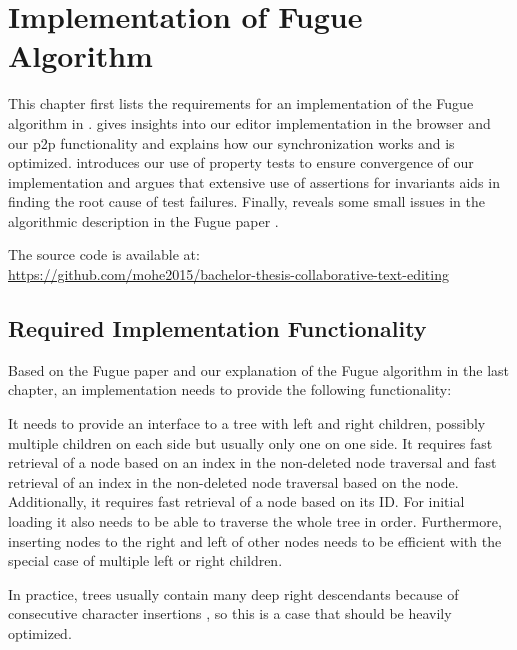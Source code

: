 \chapter{Implementation of Fugue Algorithm} \label{section:implementation}

This chapter first lists the requirements for an implementation of the Fugue algorithm in .  gives insights into our editor implementation in the browser and our \gls{p2p} functionality and  explains how our synchronization works and is optimized.  introduces our use of property tests to ensure convergence of our implementation and argues that extensive use of assertions for invariants aids in finding the root cause of test failures. Finally,  reveals some small issues in the algorithmic description in the Fugue paper \cite{2023-weidner-minimizing-interleaving}.

The source code is available at:\\
\url{https://github.com/mohe2015/bachelor-thesis-collaborative-text-editing}

\section{Required Implementation Functionality} \label{section:implementation-requirements}

Based on the Fugue paper \cite{2023-weidner-minimizing-interleaving} and our explanation of the Fugue algorithm in the last chapter, an implementation needs to provide the following functionality:

It needs to provide an interface to a tree with left and right children, possibly multiple children on each side but usually only one on one side. It requires fast retrieval of a node based on an index in the non-deleted node traversal and fast retrieval of an index in the non-deleted node traversal based on the node. Additionally, it requires fast retrieval of a node based on its ID. For initial loading it also needs to be able to traverse the whole tree in order. Furthermore, inserting nodes to the right and left of other nodes needs to be efficient with the special case of multiple left or right children.

In practice, trees usually contain many deep right descendants because of consecutive character insertions \cite[Figure 5]{2023-weidner-minimizing-interleaving}, so this is a case that should be heavily optimized.

